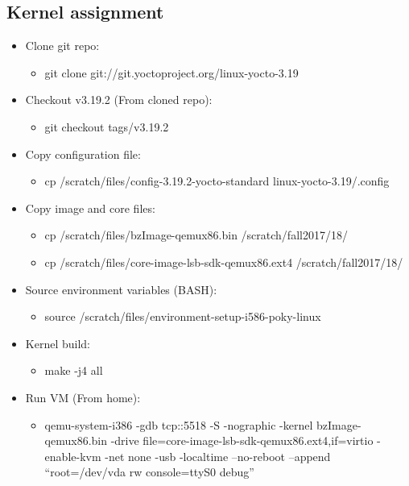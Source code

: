 \documentclass[a4paper]{article}
\begin{document}
\subsection{Kernel assignment}
\begin{itemize}
  \item Clone git repo: 
    \begin{itemize}
      \item git clone git://git.yoctoproject.org/linux-yocto-3.19
    \end{itemize}
    \item Checkout v3.19.2 (From cloned repo): 
    \begin{itemize}
      \item git checkout tags/v3.19.2
    \end{itemize}
    \item Copy configuration file: 
    \begin{itemize}
      \item cp /scratch/files/config-3.19.2-yocto-standard linux-yocto-3.19/.config
    \end{itemize}
    \item Copy image and core files: 
    \begin{itemize}
      \item cp /scratch/files/bzImage-qemux86.bin /scratch/fall2017/18/
        \item cp /scratch/files/core-image-lsb-sdk-qemux86.ext4  /scratch/fall2017/18/
    \end{itemize}
    \item Source environment variables (BASH):
        \begin{itemize}
          \item source /scratch/files/environment-setup-i586-poky-linux
        \end{itemize}
        \item Kernel build: 
        \begin{itemize}
          \item make -j4 all
        \end{itemize}
        \item Run VM (From home): 
        \begin{itemize}
          \item qemu-system-i386 -gdb tcp::5518 -S -nographic -kernel bzImage-qemux86.bin -drive file=core-image-lsb-sdk-qemux86.ext4,if=virtio -enable-kvm -net none -usb -localtime --no-reboot --append ``root=/dev/vda rw console=ttyS0 debug''
         \end{itemize}

\end{itemize}
\end{document}
